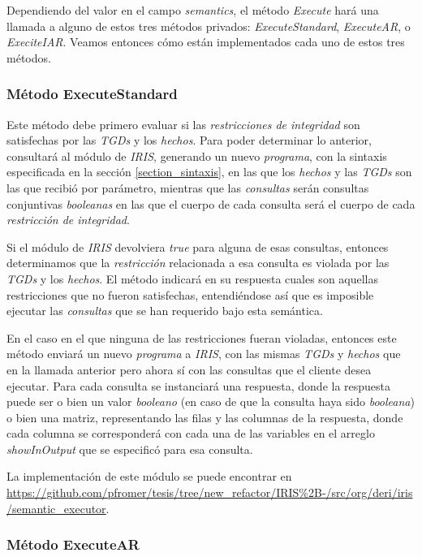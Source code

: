 \documentclass[11pt,a4paper,twoside]{tesis}
\begin{document}
Dependiendo del valor en el campo \textit{semantics}, el método \textit{Execute} hará una llamada a alguno de estos tres métodos privados: \textit{ExecuteStandard}, \textit{ExecuteAR}, o \textit{ExeciteIAR}. Veamos entonces cómo están implementados cada uno de estos tres métodos.

\subsubsection{Método ExecuteStandard}


Este método debe primero evaluar si las \textit{restricciones de integridad} son satisfechas por las \textit{TGDs} y los \textit{hechos}. Para poder determinar lo anterior, consultará al módulo de \textit{IRIS}, generando un nuevo \textit{programa}, con la sintaxis especificada en la sección \ref{section_sintaxis}, en las que los \textit{hechos} y las \textit{TGDs} son las que recibió por parámetro, mientras que las \textit{consultas} serán consultas conjuntivas \textit{booleanas} en las que el cuerpo de cada consulta será el cuerpo de cada \textit{restricción de integridad}. 

Si el módulo de \textit{IRIS} devolviera \textit{true} para alguna de esas consultas, entonces determinamos que la \textit{restricción} relacionada a esa consulta es violada por las \textit{TGDs} y los \textit{hechos}. El método indicará en su respuesta cuales son aquellas restricciones que no fueron satisfechas, entendiéndose así que es imposible ejecutar las \textit{consultas} que se han requerido bajo esta semántica.

En el caso en el que ninguna de las restricciones fueran violadas, entonces este método enviará un nuevo \textit{programa} a \textit{IRIS}, con las mismas \textit{TGDs} y \textit{hechos} que en la llamada anterior pero ahora sí con las consultas que el cliente desea ejecutar. Para cada consulta se instanciará una respuesta, donde la respuesta puede ser o bien un valor \textit{booleano} (en caso de que la consulta haya sido \textit{booleana}) o bien una matriz, representando las filas y las columnas de la respuesta, donde cada columna se corresponderá con cada una de las variables en el arreglo \textit{showInOutput} que se especificó para esa consulta.

La implementación de este módulo se puede encontrar en \url{https://github.com/pfromer/tesis/tree/new_refactor/IRIS%2B-/src/org/deri/iris/semantic_executor}.

\subsubsection{Método ExecuteAR}
\end{document}
